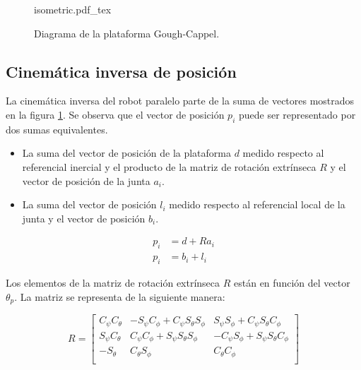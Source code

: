 \begin{figure}[htb!]
    \centering
    {isometric.pdf_tex}
    \caption{Diagrama de la plataforma Gough-Cappel.}
    \label{fig: gough stewart diagram}
\end{figure}

\subsection{Cinemática inversa de posición}

La cinemática inversa del robot paralelo parte de la suma de vectores 
mostrados en la figura \ref{fig: gough stewart diagram}.
Se observa que el vector de posición $  p_i$ puede ser representado 
por dos sumas equivalentes. 
\begin{itemize}
 \item La suma del vector de posición de la plataforma $  d$ 
medido respecto al referencial inercial y el producto de 
la matriz de rotación extrínseca $  R$ y el vector de posición 
de la junta $  a_i$. 
 \item La suma del vector de posición $  l_i$ medido respecto 
 al referencial local de la junta y el vector de posición $  b_i$.
\end{itemize}

\begin{subequations} \label{eq: plat_grl}
 \begin{align}
      p_i & =   d +   R  a_i \\
      p_i & =   b_i +   l_i
 \end{align}
\end{subequations}


Los elementos de la matriz de rotación 
extrínseca $  R$ están en función del vector $  \theta_p$.
La matriz se representa de la siguiente manera:

\begin{equation} \label{eq: Mrot-P}
  R = \begin{bmatrix}
C_\psi C_\theta & -S_\psi C_\phi + C_\psi S_\theta S_\phi & S_\psi S_\phi + C_\psi S_\theta C_\phi\\
S_\psi C_\theta & C_\psi C_\phi + S_\psi S_\theta S_\phi & -C_\psi S_\phi + S_\psi S_\theta C_\phi\\
-S_\theta & C_\theta S_\phi & C_\theta C_\phi\\
\end{bmatrix}
\end{equation}

